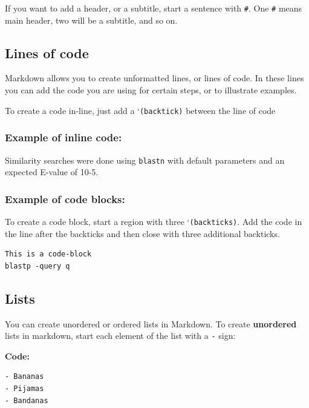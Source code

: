 \documentclass[
]{book}
\begin{document}
If you want to add a header, or a subtitle, start a sentence with \texttt{\#}. One \texttt{\#} means main header, two will be a subtitle, and so on.

\hypertarget{lines-of-code}{%
\subsection{Lines of code}\label{lines-of-code}}

Markdown allows you to create unformatted lines, or lines of code. In these lines you can add the code you are using for certain steps, or to illustrate examples.

To create a code in-line, just add a `\texttt{(backtick)} between the line of code

\hypertarget{example-of-inline-code}{%
\subsubsection{Example of inline code:}\label{example-of-inline-code}}

Similarity searches were done using \texttt{blastn} with default parameters and an expected E-value of 10-5.

\hypertarget{example-of-code-blocks}{%
\subsubsection{Example of code blocks:}\label{example-of-code-blocks}}

To create a code block, start a region with three `\texttt{(backticks)}. Add the code in the line after the backticks and then close with three additional backticks.

\begin{verbatim}
This is a code-block
blastp -query q
\end{verbatim}

\hypertarget{lists}{%
\subsection{Lists}\label{lists}}

You can create unordered or ordered lists in Markdown.
To create \textbf{unordered} lists in markdown, start each element of the list with a \texttt{-} sign:

\textbf{Code:}

\begin{verbatim}
- Bananas
- Pijamas
- Bandanas
\end{verbatim}
\end{document}
